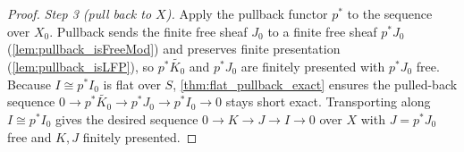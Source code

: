 \begin{lemma}
\begin{proof}
    \emph{Step 3 (pull back to $X$).} Apply the pullback functor $p^*$ to the
    sequence over $X_0$. Pullback sends the finite free sheaf $J_0$ to a finite
    free sheaf $p^* J_0$ (\cref{lem:pullback_isFreeMod}) and preserves finite
    presentation (\cref{lem:pullback_isLFP}), so $p^* \widetilde{K_0}$
    and $p^* J_0$ are finitely presented with $p^* J_0$ free. Because $I \cong
    p^* I_0$ is flat over $S$, \cref{thm:flat_pullback_exact} ensures the
    pulled-back sequence
    $0 \to p^* \widetilde{K_0} \to p^* J_0 \to p^* I_0 \to 0$ stays short exact.
    Transporting along $I \cong p^* I_0$ gives the desired sequence
    $0 \to K \to J \to I \to 0$ over $X$ with $J = p^* J_0$ free and $K, J$
    finitely presented.
  \end{proof}
\end{lemma}

